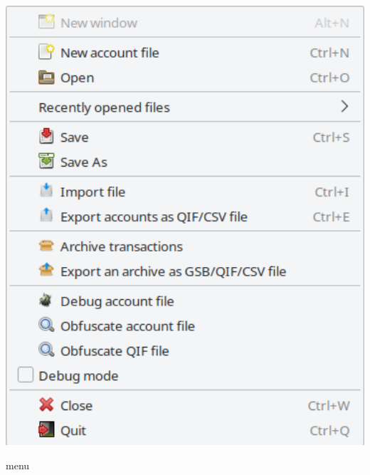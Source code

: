 \begin{minipage}{.3\linewidth}
	\vspace{-10pt}					%
	\centering						%
		\includegraphics[width=1\textwidth]{image/screenshot/home_menubar_file}
	\vspace{-10pt}					%
	\captionsetup{
	type=figure,%
	name=Fig.,%
	labelsep=newline}			%
	\caption{ menu}	%
	\label{home_menubar_file}
\end{minipage}

